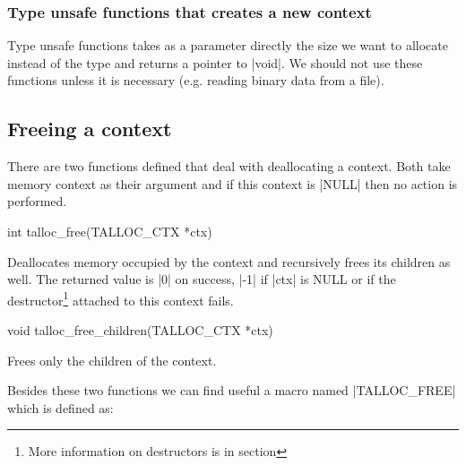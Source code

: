 
\subsubsection{Type unsafe functions that creates a new context}

Type unsafe functions takes as a parameter directly the size we want to
allocate instead of the type and returns a pointer to |void|. We should not use
these functions unless it is necessary (e.g. reading binary data from a file).



\subsection{Freeing a context}
\label{talloc:subsec:free-context}

There are two functions defined that deal with deallocating a context. Both
take memory context as their argument and if this context is |NULL| then no
action is performed.

\begin{funcproto}
int talloc_free(TALLOC_CTX *ctx)
\end{funcproto}
\begin{funcdesc}
  Deallocates memory occupied by the context and recursively frees its 
  children as well. The returned value is |0| on success, |-1| if |ctx| is NULL
  or if the destructor\footnote{More information on destructors is in section
  } attached to this context fails.
\end{funcdesc}
\begin{funcproto}
void talloc_free_children(TALLOC_CTX *ctx)
\end{funcproto}
\begin{funcdesc}
  Frees only the children of the context.
\end{funcdesc}
\funclistend
Besides these two functions we can find useful a macro named |TALLOC_FREE| which
is defined as:

